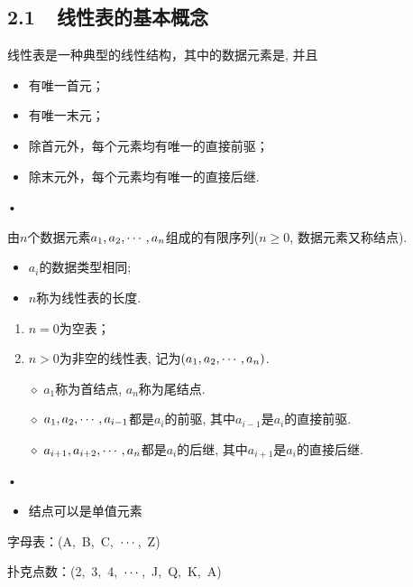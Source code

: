 \subsection{2.1~~线性表的基本概念}

\begin{frame}\ft{\subsecname}

  
  线性表是一种典型的线性结构，其中的数据元素是, 并且
  \begin{itemize}
  \item
    有唯一首元；
  \item
    有唯一末元；
  \item
    除首元外，每个元素均有唯一的直接前驱；
  \item
    除末元外，每个元素均有唯一的直接后继. 
  \end{itemize}•

\end{frame}

\begin{frame}\ft{\subsecname}
\begin{dingyi}
由$n$个数据元素$a_1,a_2,\cdots,a_n$组成的有限序列($n\ge 0$, 数据元素又称结点).
\begin{itemize}
\item $a_i$的数据类型相同;
\item $n$称为线性表的长度.
\end{itemize}
\end{dingyi}

\pause 
\begin{enumerate}
\item $n=0$为空表；\\[0.1in]
\item $n>0$为非空的线性表, 记为$(a_1,a_2,\cdots,a_n)$. \\[0.1in]
\item[$\diamond$]
$a_1$称为首结点, $a_n$称为尾结点.  
\item[$\diamond$]
$a_1,a_2,\cdots,a_{i-1}$都是$a_i%
$的前驱, 其中$a_{i-1}$是$a_i$的直接前驱. 
\item[$\diamond$]
$a_{i+1},a_{i+2},\cdots,a_{n}$都是$a_i%
$的后继, 其中$a_{i+1}$是$a_i$的直接后继. 
\end{enumerate}•
\end{frame}

\begin{frame}\ft{\subsecname}
\begin{itemize}
\item%
结点可以是单值元素%
\end{itemize}

\begin{li}
字母表：(A,~B,~C,~$\cdots$,~Z)
\end{li}	

\begin{li}
扑克点数：(2,~3,~4,~$\cdots$,~J,~Q,~K,~A)
\end{li}	

\end{frame}

